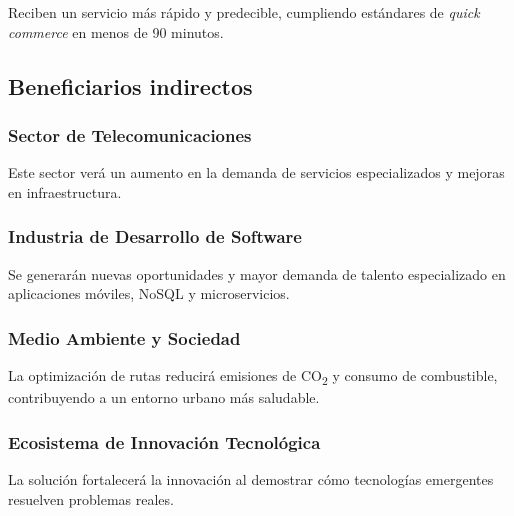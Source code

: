 Reciben un servicio más rápido y predecible, cumpliendo estándares de \textit{quick commerce} en menos de 90 minutos.

\subsection{Beneficiarios indirectos}

\subsubsection{Sector de Telecomunicaciones}

Este sector verá un aumento en la demanda de servicios especializados y mejoras en infraestructura.

\subsubsection{Industria de Desarrollo de Software}

Se generarán nuevas oportunidades y mayor demanda de talento especializado en aplicaciones móviles, NoSQL y microservicios.

\subsubsection{Medio Ambiente y Sociedad}

La optimización de rutas reducirá emisiones de CO\textsubscript{2} y consumo de combustible, contribuyendo a un entorno urbano más saludable.

\subsubsection{Ecosistema de Innovación Tecnológica}

La solución fortalecerá la innovación al demostrar cómo tecnologías emergentes resuelven problemas reales.